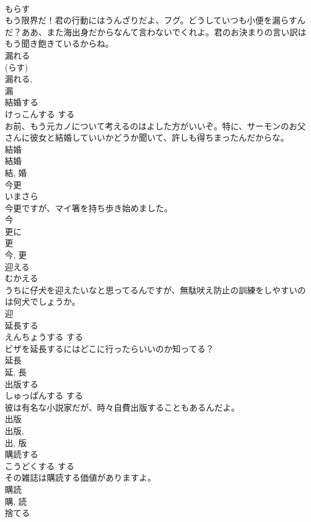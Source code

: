 \documentclass[8pt]{extreport}
\begin{document}
\begin{CJK}{UTF8}{min}
\\	もらす	
\\	もう限界だ！君の行動にはうんざりだよ、フグ。どうしていつも小便を漏らすんだ？ああ、また海出身だからなんて言わないでくれよ。君のお決まりの言い訳はもう聞き飽きているからね。	
\\	漏れる 
\\	(らす) 
\\	漏れる, 
\\	漏	
\\	結婚する	
\\	けっこんする	する 
\\	お前、もう元カノについて考えるのはよした方がいいぞ。特に、サーモンのお父さんに彼女と結婚していいかどうか聞いて、許しも得ちまったんだからな。	
\\	結婚 
\\	結婚 
\\	結, 婚	
\\	今更	
\\	いまさら	
\\	今更ですが、マイ箸を持ち歩き始めました。	
\\	今 
\\	更に
\\	更 
\\	今, 更	
\\	迎える	
\\	むかえる	
\\	うちに仔犬を迎えたいなと思ってるんですが、無駄吠え防止の訓練をしやすいのは何犬でしょうか。	
\\	迎	
\\	延長する	
\\	えんちょうする	する 
\\	ビザを延長するにはどこに行ったらいいのか知ってる？	
\\	延長 
\\	延, 長	
\\	出版する	
\\	しゅっぱんする	する 
\\	彼は有名な小説家だが、時々自費出版することもあるんだよ。	
\\	出版 
\\	出版, 
\\	出, 版	
\\	購読する	
\\	こうどくする	する 
\\	その雑誌は購読する価値がありますよ。	
\\	購読 
\\	購, 読	
\\	捨てる	

\end{CJK}
\end{document}
